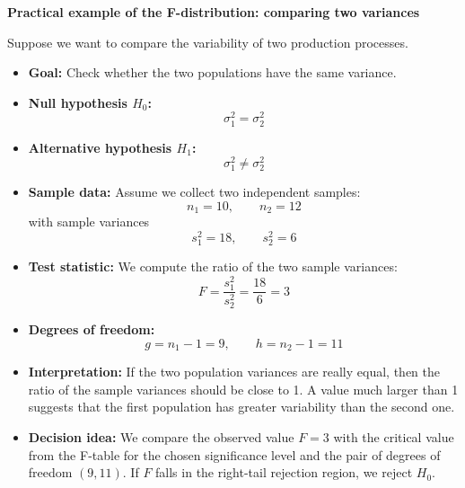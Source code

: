     \begin{example}{\textbf{Practical example of the F-distribution: comparing two variances}}

Suppose we want to compare the variability of two production processes.

\begin{itemize}
    \item \textbf{Goal:} Check whether the two populations have the same variance.

    \item \textbf{Null hypothesis \(H_0\):}
    \[
    \sigma_1^2=\sigma_2^2
    \]

    \item \textbf{Alternative hypothesis \(H_1\):}
    \[
    \sigma_1^2 \neq \sigma_2^2
    \]

    \item \textbf{Sample data:} Assume we collect two independent samples:
    \[
    n_1=10, \qquad n_2=12
    \]
    with sample variances
    \[
    s_1^2=18, \qquad s_2^2=6
    \]

    \item \textbf{Test statistic:} We compute the ratio of the two sample variances:
    \[
    F=\frac{s_1^2}{s_2^2}=\frac{18}{6}=3
    \]

    \item \textbf{Degrees of freedom:}
    \[
    g=n_1-1=9, \qquad h=n_2-1=11
    \]

    \item \textbf{Interpretation:} If the two population variances are really equal, then the ratio of the sample variances should be close to 1. A value much larger than 1 suggests that the first population has greater variability than the second one.

    \item \textbf{Decision idea:} We compare the observed value \(F=3\) with the critical value from the F-table for the chosen significance level and the pair of degrees of freedom \((9,11)\). If \(F\) falls in the right-tail rejection region, we reject \(H_0\).
\end{itemize}
\end{example}

